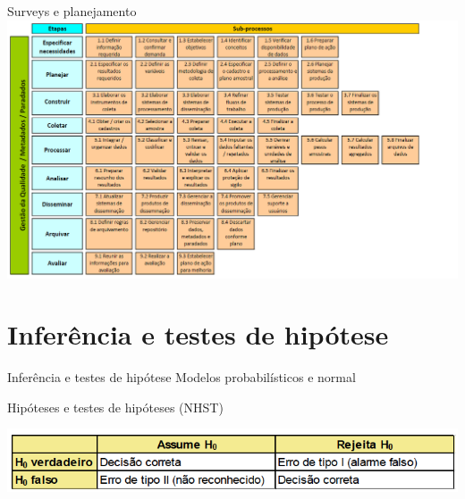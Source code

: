 \documentclass[
  9pt,
  ignorenonframetext,
  aspectratio=169]{beamer}
\begin{document}
\begin{frame}{Surveys e planejamento}
\includegraphics{imgs/ProcessodePesquisaModelo.png}
\end{frame}

\hypertarget{inferuxeancia-e-testes-de-hipuxf3tese}{%
\section{Inferência e testes de
hipótese}\label{inferuxeancia-e-testes-de-hipuxf3tese}}

\begin{frame}{Inferência e testes de hipótese}
Modelos probabilísticos e normal

Hipóteses e testes de hipóteses (NHST)
\end{frame}

\begin{frame}{}
\protect\hypertarget{section-8}{}
\includegraphics{imgs/tabela_erros.png}
\end{frame}
\end{document}
